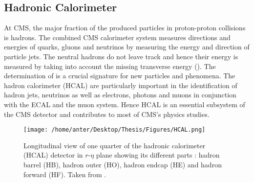\subsection{Hadronic Calorimeter}
At CMS, the major fraction of the produced particles in proton-proton collisions is hadrons. The combined CMS calorimeter system measures directions and energies of quarks, gluons and neutrinos by measuring the energy and direction of particle jets. The neutral hadrons do not leave track and hence their energy is measured by taking into account the missing transverse energy (\ETmiss). The determination of \ETmiss is a crucial signature for new particles and phenomena. The hadron calorimeter (HCAL) are particularly important in the identification of hadron jets, neutrinos as well as electrons, photons and muons in conjunction with the ECAL and the muon system. Hence HCAL is an essential subsystem of the CMS detector and contributes to most of CMS's physics studies.
\begin{figure}[!h]
\begin{center}
\vspace*{3mm} 
\hspace*{-5mm}
\texttt{[image: /home/anter/Desktop/Thesis/Figures/HCAL.png]}\\
\vspace*{4mm}
\caption{Longitudinal view of one quarter of the hadronic calorimeter (HCAL) detector in $r$-$\eta$ plane showing its different parts : hadron barrel (HB), hadron outer (HO), hadron endcap (HE) and hadron forward (HF). Taken from \cite{Chatrchyan:2008aa}.}
\label{fig:hcal}
\end{center}
\end{figure}

